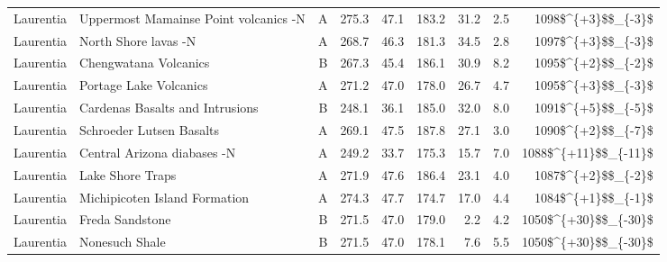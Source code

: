 \begin{longtable}{p{1 in}p{1 in}rrrrrrr}
                     Laurentia &              Uppermost Mamainse Point volcanics -N &      A &     275.3 &      47.1 & 183.2 &  31.2 &       2.5 &     1098\$\textasciicircum \{+3\}\$\$\_\{-3\}\$ \\
                     Laurentia &                               North Shore lavas -N &      A &     268.7 &      46.3 & 181.3 &  34.5 &       2.8 &     1097\$\textasciicircum \{+3\}\$\$\_\{-3\}\$ \\
                     Laurentia &                              Chengwatana Volcanics &      B &     267.3 &      45.4 & 186.1 &  30.9 &       8.2 &     1095\$\textasciicircum \{+2\}\$\$\_\{-2\}\$ \\
                     Laurentia &                             Portage Lake Volcanics &      A &     271.2 &      47.0 & 178.0 &  26.7 &       4.7 &     1095\$\textasciicircum \{+3\}\$\$\_\{-3\}\$ \\
                     Laurentia &                    Cardenas Basalts and Intrusions &      B &     248.1 &      36.1 & 185.0 &  32.0 &       8.0 &     1091\$\textasciicircum \{+5\}\$\$\_\{-5\}\$ \\
                     Laurentia &                           Schroeder Lutsen Basalts &      A &     269.1 &      47.5 & 187.8 &  27.1 &       3.0 &     1090\$\textasciicircum \{+2\}\$\$\_\{-7\}\$ \\
                     Laurentia &                        Central Arizona diabases -N &      A &     249.2 &      33.7 & 175.3 &  15.7 &       7.0 &   1088\$\textasciicircum \{+11\}\$\$\_\{-11\}\$ \\
                     Laurentia &                                   Lake Shore Traps &      A &     271.9 &      47.6 & 186.4 &  23.1 &       4.0 &     1087\$\textasciicircum \{+2\}\$\$\_\{-2\}\$ \\
                     Laurentia &                      Michipicoten Island Formation &      A &     274.3 &      47.7 & 174.7 &  17.0 &       4.4 &     1084\$\textasciicircum \{+1\}\$\$\_\{-1\}\$ \\
                     Laurentia &                                    Freda Sandstone &      B &     271.5 &      47.0 & 179.0 &   2.2 &       4.2 &   1050\$\textasciicircum \{+30\}\$\$\_\{-30\}\$ \\
                     Laurentia &                                     Nonesuch Shale &      B &     271.5 &      47.0 & 178.1 &   7.6 &       5.5 &   1050\$\textasciicircum \{+30\}\$\$\_\{-30\}\$ \\

\end{longtable}
